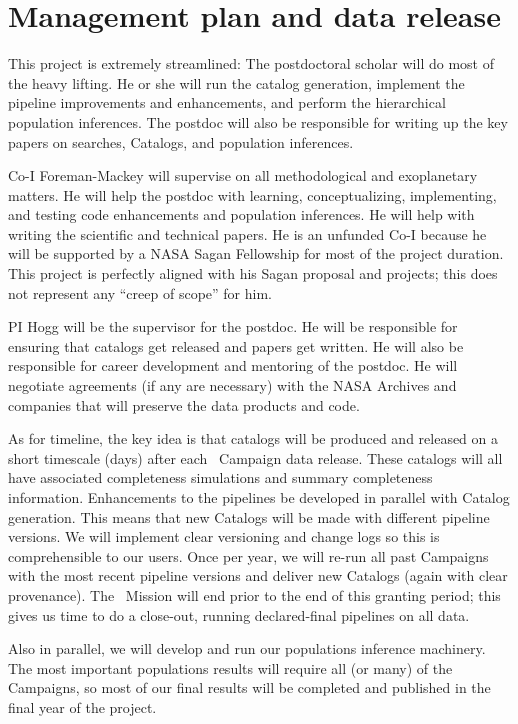\documentclass[12pt,preprint]{aastex}
\begin{document}
\section{Management plan and data release}

This project is extremely streamlined:
The postdoctoral scholar will do most of the heavy lifting.
He or she will run the catalog generation,
implement the pipeline improvements and enhancements,
and perform the hierarchical population inferences.
The postdoc will also be responsible for writing up the key papers
on searches, Catalogs, and population inferences.

Co-I Foreman-Mackey will supervise on all methodological and exoplanetary
matters.
He will help the postdoc with learning, conceptualizing, implementing,
and testing code enhancements and population inferences.
He will help with writing the scientific and technical papers.
He is an unfunded Co-I because he will be supported by a NASA Sagan
Fellowship for most of the project duration.
This project is perfectly aligned with his Sagan proposal and projects;
this does not represent any ``creep of scope'' for him.

PI Hogg will be the supervisor for the postdoc.
He will be responsible for ensuring that catalogs get released and
papers get written.
He will also be responsible for career development and mentoring
of the postdoc.
He will negotiate agreements (if any are necessary) with the NASA
Archives and companies that will preserve the data products and code.

As for timeline, the key idea is that catalogs will be produced and
released on a short timescale (days) after each \kt\ Campaign data
release.
These catalogs will all have associated completeness simulations
and summary completeness information.
Enhancements to the pipelines be developed in parallel with Catalog
generation.
This means that new Catalogs will be made with different pipeline
versions.
We will implement clear versioning and change logs so this is
comprehensible to our users.
Once per year, we will re-run all past Campaigns with the most recent
pipeline versions and deliver new Catalogs (again with clear
provenance).
The \kt\ Mission will end prior to the end of this granting period;
this gives us time to do a close-out, running declared-final pipelines
on all data.

Also in parallel, we will develop and run our populations inference
machinery.
The most important populations results will require all (or many) of
the Campaigns, so most of our final results will be completed and
published in the final year of the project.
\end{document}
